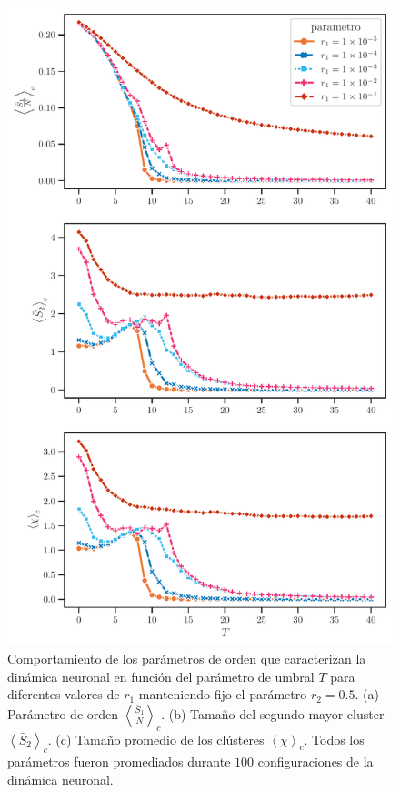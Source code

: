 \begin{figure}[h!]
	\centering\includegraphics[width=\imsize]{variando_r1_hermafrodita.pdf}
	\caption[Comportamiento de los parámetros  que caracterizan la  dinámica neuronal   en función del parámetro de umbral $T$  para diferentes
	valores de $r_1$ manteniendo fijo el parámetro $r_2=0.5$.]{Comportamiento de los parámetros de orden que caracterizan la  dinámica neuronal   en función del parámetro de umbral $T$  para diferentes
		valores de $r_1$ manteniendo fijo el parámetro $r_2=0.5$. (a) Parámetro de orden $\left\langle\frac{\bar{S}_1}{N}\right\rangle_c$. (b) Tamaño del segundo mayor cluster $\left\langle\bar{S}_2\right\rangle_c$. (c) Tamaño promedio de los clústeres $\left\langle\chi\right\rangle_c$. Todos los parámetros fueron promediados durante $100$ configuraciones de la dinámica neuronal.}\label{fig:diagrama_fase_variando_r1}
\end{figure}



